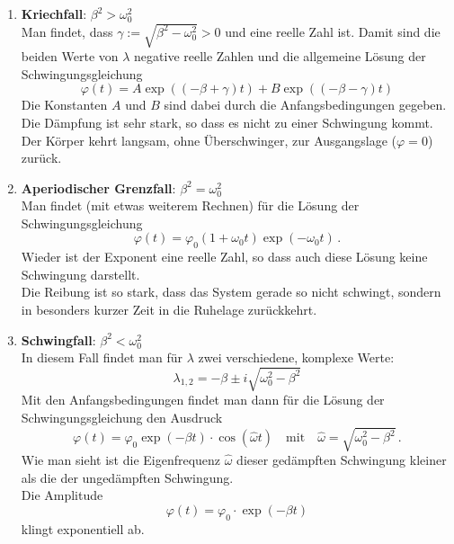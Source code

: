 \begin{enumerate}[label=\alph*.)] 
	\item \textbf{Kriechfall}: $\beta^2 > \omega_0^2$\\
		Man findet, dass $\gamma := \sqrt{\beta^2 - \omega_0^2} > 0$ und eine reelle Zahl ist. Damit sind die beiden Werte von $\lambda$ negative reelle Zahlen und die allgemeine Lösung der Schwingungsgleichung
		\begin{equation*}
			\varphi(t) = A\exp((-\beta+\gamma) t) + B\exp((-\beta -\gamma) t)
		\end{equation*}
		Die Konstanten $A$ und $B$ sind dabei durch die Anfangsbedingungen gegeben.\\
		Die Dämpfung ist sehr stark, so dass es nicht zu einer Schwingung kommt. Der Körper kehrt langsam, ohne Überschwinger, zur Ausgangslage ($\varphi = 0$) zurück.
	\item \textbf{Aperiodischer Grenzfall}: $\beta^2 = \omega_0^2$\\
		Man findet (mit etwas weiterem Rechnen) für die Lösung der Schwingungsgleichung
		\begin{equation*}
			\varphi(t) = \varphi_0\left(1 + \omega_0 t\right) \exp(-\omega_0 t)\, .
		\end{equation*}
		Wieder ist der Exponent eine reelle Zahl, so dass auch diese Lösung keine Schwingung darstellt.\\
		Die Reibung ist so stark, dass das System gerade so nicht schwingt, sondern in besonders kurzer Zeit in die Ruhelage zurückkehrt.
	\item \textbf{Schwingfall}: $\beta^2 < \omega_0^2$\\
		In diesem Fall findet man für $\lambda$ zwei verschiedene, komplexe Werte:
		\begin{equation*}
			\lambda_{1,2} = -\beta \pm i\sqrt{\omega_0^2 - \beta^2}
		\end{equation*}
		Mit den Anfangsbedingungen findet man dann für die Lösung der Schwingungsgleichung den Ausdruck
		\begin{equation}
			\varphi(t) = \varphi_0\exp(-\beta t)\cdot\cos(\hat{\omega}t) \quad \mathrm{mit}\quad \hat{\omega}=\sqrt{\omega_0^2 -\beta^2}\, .
			\label{eq:Schwingfall}
		\end{equation}
		Wie man sieht ist die Eigenfrequenz $\hat{\omega}$ dieser gedämpften Schwingung kleiner als die der ungedämpften Schwingung.\\
		Die Amplitude
		\begin{equation}
			\varphi(t) = \varphi_0\cdot \exp(-\beta t)
			\label{eq:Amplitude_gedaempft}
		\end{equation}
		klingt exponentiell ab.
		
\end{enumerate}

